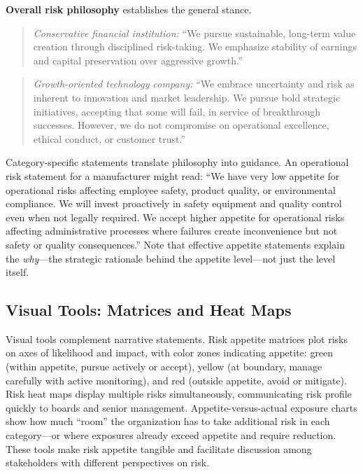 \documentclass[11pt,openany]{book}
\begin{document}
\textbf{Overall risk philosophy} establishes the general stance.

\begin{quote}
\emph{Conservative financial institution:} ``We pursue sustainable, long-term
value creation through disciplined risk-taking. We emphasize stability of
earnings and capital preservation over aggressive growth.''
\end{quote}

\begin{quote}
\emph{Growth-oriented technology company:} ``We embrace uncertainty and risk as
inherent to innovation and market leadership. We pursue bold strategic
initiatives, accepting that some will fail, in service of breakthrough successes.
However, we do not compromise on operational excellence, ethical conduct, or
customer trust.''
\end{quote}

Category-specific statements translate philosophy into guidance. An operational
risk statement for a manufacturer might read: ``We have very low appetite for
operational risks affecting employee safety, product quality, or environmental
compliance. We will invest proactively in safety equipment and quality control
even when not legally required. We accept higher appetite for operational risks
affecting administrative processes where failures create inconvenience but not
safety or quality consequences.'' Note that effective appetite statements explain
the \emph{why}---the strategic rationale behind the appetite level---not just
the level itself.

\subsection{Visual Tools: Matrices and Heat Maps}
\label{subsec:visual-tools}

Visual tools complement narrative statements. Risk appetite matrices plot risks
on axes of likelihood and impact, with color zones indicating appetite: green
(within appetite, pursue actively or accept), yellow (at boundary, manage
carefully with active monitoring), and red (outside appetite, avoid or mitigate).
Risk heat maps display multiple risks simultaneously, communicating risk profile
quickly to boards and senior management. Appetite-versus-actual exposure charts
show how much ``room'' the organization has to take additional risk in each
category---or where exposures already exceed appetite and require reduction.
These tools make risk appetite tangible and facilitate discussion among
stakeholders with different perspectives on risk.
\end{document}
